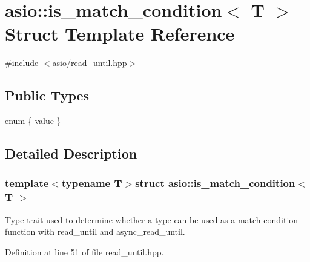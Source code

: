 \hypertarget{structasio_1_1is__match__condition}{}\section{asio\+:\+:is\+\_\+match\+\_\+condition$<$ T $>$ Struct Template Reference}
\label{structasio_1_1is__match__condition}


{\ttfamily \#include $<$asio/read\+\_\+until.\+hpp$>$}

\subsection*{Public Types}
\begin{DoxyCompactItemize}
\item 
enum \{ \hyperlink{structasio_1_1is__match__condition_afe8389939a27ff4c6ea99aa7832102bca2aba8c96f065178b82ad75dff454778e}{value}
 \}
\end{DoxyCompactItemize}


\subsection{Detailed Description}
\subsubsection*{template$<$typename T$>$struct asio\+::is\+\_\+match\+\_\+condition$<$ T $>$}

Type trait used to determine whether a type can be used as a match condition function with read\+\_\+until and async\+\_\+read\+\_\+until. 

Definition at line 51 of file read\+\_\+until.\+hpp.



